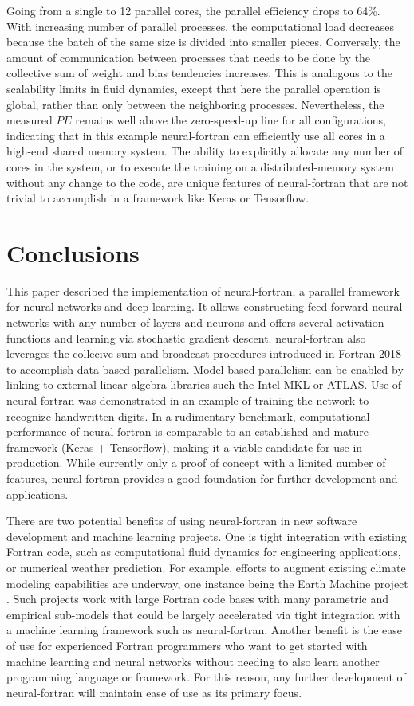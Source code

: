 \documentclass[sigplan, review=false, screen=true, balance=true]{acmart}
\begin{document}
Going from a single to 12 parallel cores, the parallel efficiency drops
to 64\%. With increasing number of parallel processes, the computational
load decreases because the batch of the same size is divided into smaller pieces.
Conversely, the amount of communication between processes that needs to be
done by the collective sum of weight and bias tendencies increases. This is
analogous to the scalability limits in fluid dynamics, except that here the
parallel operation is global, rather than only between the neighboring
processes. 
Nevertheless, the measured $PE$ remains well above the zero-speed-up line
for all configurations, indicating that in this example neural-fortran
can efficiently use all cores in a high-end shared memory system.
The ability to explicitly allocate any number
of cores in the system, or to execute the training on a distributed-memory
system without any change to the code, are unique features of neural-fortran
that are not trivial to accomplish in a framework like Keras or Tensorflow.

\section{Conclusions} \label{section_conclusions}

This paper described the implementation of neural-fortran, a parallel framework
for neural networks and deep learning. It allows constructing feed-forward
neural networks with any number of layers and neurons and offers several
activation functions and learning via stochastic gradient descent.
neural-fortran also leverages the collecive sum and broadcast procedures
introduced in Fortran 2018 to accomplish data-based parallelism.
Model-based parallelism can be enabled by linking to external linear algebra
libraries such the Intel MKL or ATLAS. Use of neural-fortran was demonstrated
in an example of training the network to recognize handwritten digits.
In a rudimentary benchmark, computational performance of neural-fortran is
comparable to an established and mature framework (Keras + Tensorflow),
making it a viable candidate for use in production.
While currently only a proof of concept with a limited number of features,
neural-fortran provides a good foundation for further development and
applications.

There are two potential benefits of using neural-fortran in new
software development and machine learning projects.
One is tight integration with existing Fortran code, such as computational
fluid dynamics for engineering applications, or numerical weather prediction.
For example, efforts to augment existing climate modeling capabilities are underway,
one instance being the Earth Machine project \citep{schneider17, voosen18}.
Such projects work with large Fortran code bases with many parametric and
empirical sub-models that could be largely accelerated via tight integration
with a machine learning framework such as neural-fortran.
Another benefit is the ease of use for experienced Fortran programmers who
want to get started with machine learning and neural networks without needing
to also learn another programming language or framework. For this reason, any
further development of neural-fortran will maintain ease of use as its primary
focus.
\end{document}
